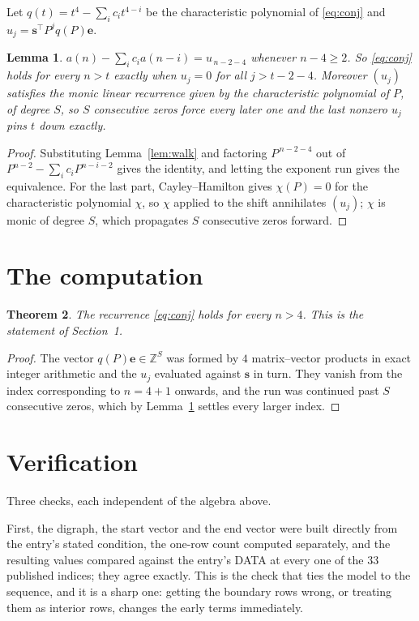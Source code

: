 \documentclass[11pt,a4paper]{article}
\theoremstyle{plain}
\newtheorem{theorem}{Theorem}
\newtheorem{lemma}[theorem]{Lemma}
\theoremstyle{definition}
\begin{document}
Let $q(t)=t^{4}-\sum_i c_i t^{4-i}$ be the characteristic polynomial of
\eqref{eq:conj} and $u_j=\mathbf{s}^{\!\top}P^{j}q(P)\mathbf{e}$.

\begin{lemma}\label{lem:crit}
$a(n)-\sum_i c_i a(n-i)=u_{\,n-2-4}$ whenever $n-4\ge2$. So \eqref{eq:conj}
holds for every $n>t$ exactly when $u_j=0$ for all $j>t-2-4$. Moreover $(u_j)$
satisfies the monic linear recurrence given by the characteristic polynomial of $P$, of
degree $S$, so $S$ consecutive zeros force every later one and the last nonzero $u_j$ pins
$t$ down exactly.
\end{lemma}

\begin{proof}
Substituting Lemma~\ref{lem:walk} and factoring $P^{\,n-2-4}$ out of
$P^{n-2}-\sum_i c_i P^{n-i-2}$ gives the identity, and letting the exponent run gives the
equivalence. For the last part, Cayley--Hamilton gives $\chi(P)=0$ for the characteristic
polynomial $\chi$, so $\chi$ applied to the shift annihilates $(u_j)$; $\chi$ is monic of
degree $S$, which propagates $S$ consecutive zeros forward.
\end{proof}

\section{The computation}

\begin{theorem}
The recurrence \eqref{eq:conj} holds for every $n>4$. This is the statement of
Section~1.
\end{theorem}

\begin{proof}
The vector $q(P)\mathbf{e}\in\mathbb{Z}^{S}$ was formed by $4$ matrix--vector
products in exact integer arithmetic and the $u_j$ evaluated against $\mathbf{s}$ in turn.
They vanish from the index corresponding to $n=4+1$ onwards, and the run was continued
past $S$ consecutive zeros, which by Lemma~\ref{lem:crit} settles every larger index.
\end{proof}

\section{Verification}

Three checks, each independent of the algebra above.

First, the digraph, the start vector and the end vector were built directly from the
entry's stated condition, the one-row count computed separately, and the resulting values
compared against the entry's DATA at every one of the $33$ published indices; they
agree exactly. This is the check that ties the model to the sequence, and it is a sharp one:
getting the boundary rows wrong, or treating them as interior rows, changes the early terms
immediately.
\end{document}

